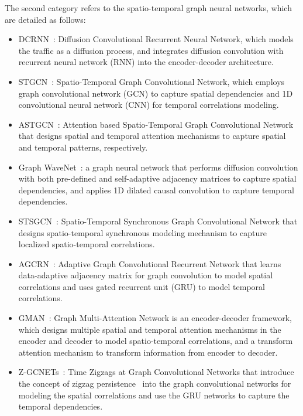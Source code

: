 \documentclass[10pt,journal,compsoc]{IEEEtran}
\begin{document}
The second category refers to the spatio-temporal graph neural networks, which are detailed as follows:

\begin{itemize}
	\item DCRNN~\cite{Li-et-al:ICLR2018}: Diffusion Convolutional Recurrent Neural Network, which models the traffic as a diffusion process, and integrates diffusion convolution with recurrent neural network (RNN) into the encoder-decoder architecture. 
	\item STGCN~\cite{Yu-et-al:IJCAI2018}: Spatio-Temporal Graph Convolutional Network, which employs graph convolutional network (GCN) to capture spatial dependencies and 1D convolutional neural network (CNN) for temporal correlations modeling.
	\item ASTGCN~\cite{Guo-et-al:AAAI2019}: Attention based Spatio-Temporal Graph Convolutional Network that designs spatial and temporal attention mechanisms to capture spatial and temporal patterns, respectively. 
	\item Graph WaveNet~\cite{Wu-et-al:IJCAI2019}: a graph neural network that performs diffusion convolution with both pre-defined and self-adaptive adjacency matrices to capture spatial dependencies, and applies 1D dilated causal convolution to capture temporal dependencies.
	\item STSGCN~\cite{Song-et-al:AAAI2020}: Spatio-Temporal Synchronous Graph Convolutional Network that designs spatio-temporal synchronous modeling mechanism to capture localized spatio-temporal correlations.
	\item AGCRN~\cite{Bai-et-al:NIPS2020}: Adaptive Graph Convolutional Recurrent Network that learns data-adaptive adjacency matrix for graph convolution to model spatial correlations and uses gated recurrent unit (GRU) to model temporal correlations.   
	\item GMAN~\cite{Zheng-et-al:AAAI2020}: Graph Multi-Attention Network is an encoder-decoder framework, which designs multiple spatial and temporal attention mechanisms in the encoder and decoder to model spatio-temporal correlations, and a transform attention mechanism to transform information from encoder to decoder.
	\item Z-GCNETs~\cite{Chen-et-al:ICML2021}: Time Zigzags at Graph Convolutional Networks that introduce the concept of zigzag persistence~\cite{Carlsson-and-Silva:2010} into the graph convolutional networks for modeling the spatial correlations and use the GRU networks to capture the temporal dependencies.
\end{itemize}
\end{document}
